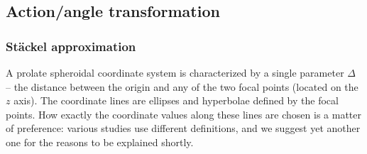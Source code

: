 \documentclass[12pt]{article}
\begin{document}
\subsection{Action/angle transformation}  \label{sec:ActionsDetails}
\subsubsection{St\"ackel approximation}  \label{sec:ActionsStaeckelDetails}

A prolate spheroidal coordinate system is characterized by a single parameter $\Delta$ -- the distance between the origin and any of the two focal points (located on the $z$ axis). The coordinate lines are ellipses and hyperbolae defined by the focal points. How exactly the coordinate values along these lines are chosen is a matter of preference: various studies use different definitions, and we suggest yet another one for the reasons to be explained shortly. 
\end{document}
